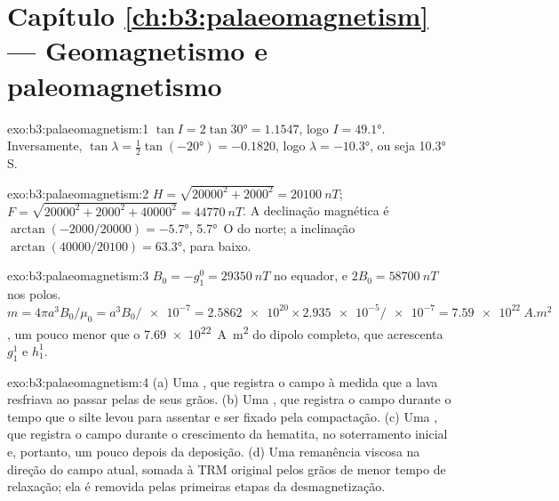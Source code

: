 \section*{Capítulo \ref{ch:b3:palaeomagnetism} --- Geomagnetismo e paleomagnetismo}

\begin{solution}{exo:b3:palaeomagnetism:1}
$\tan I = 2\tan\ang{30} = 1.1547$, logo $I = \ang{49.1}$. Inversamente, $\tan\lambda
= \tfrac12\tan(\ang{-20}) = -0.1820$, logo $\lambda = \ang{-10.3}$, ou seja
\ang{10.3}\,S.
\end{solution}

\begin{solution}{exo:b3:palaeomagnetism:2}
$H = \sqrt{20000^2 + 2000^2} = \qty{20100}{nT}$;
$F = \sqrt{20000^2 + 2000^2 + 40000^2} = \qty{44770}{nT}$. A
declinação magnética é $\arctan(-2000/20000) = \ang{-5.7}$, \ang{5.7}~O do norte;
a inclinação $\arctan(40000/20100) = \ang{63.3}$, para baixo.
\end{solution}

\begin{solution}{exo:b3:palaeomagnetism:3}
$B_0 = -g_1^0 = \qty{29350}{nT}$ no equador, e $2B_0 = \qty{58700}{nT}$ nos
polos. $m = 4\pi a^3B_0/\mu_0 = a^3B_0/\num{e-7} = \num{2.5862e20}\times
\num{2.935e-5}/\num{e-7} = \qty{7.59e22}{A.m^2}$, um pouco menor que o
\qty{7.69e22}{A.m^2} do dipolo completo, que acrescenta $g_1^1$ e $h_1^1$.
\end{solution}

\begin{solution}{exo:b3:palaeomagnetism:4}
(a) Uma , que registra o campo à medida que a lava
resfriava ao passar pelas  de seus grãos. (b) Uma
, que registra o campo durante o tempo que o silte levou para assentar e
ser fixado pela compactação. (c) Uma , que registra o
campo durante o crescimento da hematita, no soterramento inicial e, portanto, um pouco
depois da deposição. (d) Uma remanência viscosa na direção do campo atual, somada à
TRM original pelos grãos de menor tempo de relaxação; ela é removida pelas
primeiras etapas da desmagnetização.
\end{solution}

